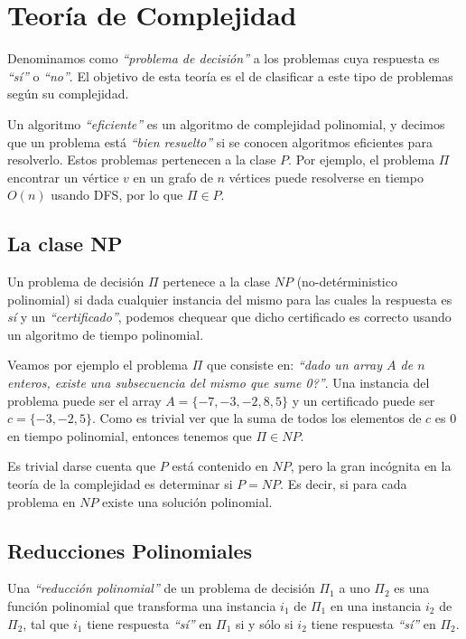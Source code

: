 \newpage
\section{Teor\'ia de Complejidad}

Denominamos como \emph{``problema de decisi\'on''} a los problemas cuya respuesta es \emph{``s\'i''} o \emph{``no''}. El objetivo de esta teor\'ia es el de clasificar a este tipo de problemas seg\'un su complejidad.

Un algoritmo \emph{``eficiente''} es un algoritmo de complejidad polinomial, y decimos que un problema est\'a \emph{``bien resuelto''} si se conocen algoritmos eficientes para resolverlo. Estos problemas pertenecen a la clase $P$. Por ejemplo, el problema $\Pi$ encontrar un v\'ertice $v$ en un grafo de $n$ v\'ertices puede resolverse en tiempo $O(n)$ usando DFS, por lo que $\Pi \in P$.

\subsection{La clase NP}

Un problema de decisi\'on $\Pi$ pertenece a la clase $NP$ (no-det\'erministico polinomial) si dada cualquier instancia del mismo para las cuales la respuesta es \emph{s\'i} y un \emph{``certificado''}, podemos chequear que dicho certificado es correcto usando un algoritmo de tiempo polinomial.

Veamos por ejemplo el problema $\Pi$ que consiste en: \emph{``dado un array $A$ de $n$ enteros, existe una subsecuencia del mismo que sume 0?''}. Una instancia del problema puede ser el array $A = \{-7, -3, -2, 8, 5\}$ y un certificado puede ser $c = \{-3, -2, 5\}$. Como es trivial ver que la suma de todos los elementos de $c$ es $0$ en tiempo polinomial, entonces tenemos que $\Pi \in NP$.

Es trivial darse cuenta que $P$ est\'a contenido en $NP$, pero la gran inc\'ognita en la teor\'ia de la complejidad es determinar si $P = NP$. Es decir, si para cada problema en $NP$ existe una soluci\'on polinomial.


\subsection{Reducciones Polinomiales}

Una \emph{``reducci\'on polinomial''} de un problema de decisi\'on $\Pi_1$ a uno $\Pi_2$ es una funci\'on polinomial que transforma una instancia  $i_1$ de $\Pi_1$ en una instancia $i_2$ de $\Pi_2$, tal que $i_1$ tiene respuesta \emph{``s\'i''} en $\Pi_1$ si y s\'olo si $i_2$ tiene respuesta \emph{``s\'i''} en $\Pi_2$.

